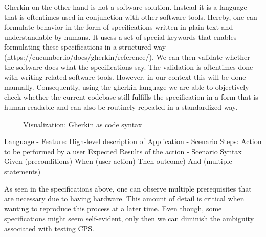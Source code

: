 Gherkin on the other hand is not a software solution. Instead it is a language that is oftentimes used in conjunction with other software tools. Hereby, one can formulate behavior in the form of specifications written in plain text and understandable by humans. It usess a set of special keywords that enables formulating these specifications in a structured way (https://cucumber.io/docs/gherkin/reference/). We can then validate whether the software does what the specifications say. The validation is oftentimes done with writing related software tools. However, in our context this will be done manually. Consequently, using the gherkin language we are able to objectively check whether the current codebase still fulfills the specification in a form that is human readable and can also be routinely repeated in a standardized way. 

=== Visualization: Gherkin as code syntax ===

Language
- Feature: 
	High-level description of Application
- Scenario Steps: 
	Action to be performed by a user
	Expected Results of the action
- Scenario Syntax
	Given (preconditions)
	When (user action)
	Then outcome)
	And (multiple statements)

As seen in the specifications above, one can observe multiple prerequisites that are necessary due to having hardware. This amount of detail is critical when wanting to reproduce this process at a later time. Even though, some specifications might seem self-evident, only then we can diminish the ambiguity associated with testing CPS. 





